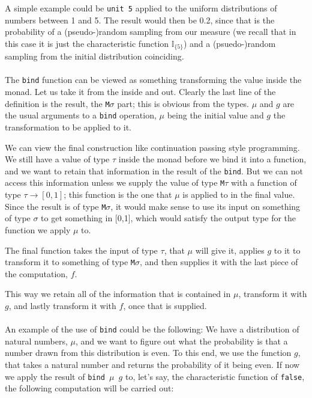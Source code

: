 \documentclass[11pt, leqno, titlepage]{article}
\theoremstyle{definition}
\begin{document}
A simple example could be \texttt{unit 5} applied to the uniform distributions of
numbers between 1 and 5. The result would then be 0.2, since that is the probability
of a (pseudo-)random sampling from our measure (we recall that in this case it is
just the characteristic function $\mathbb{I}_{\{5\}}$) and a (psuedo-)random sampling
from the initial distribution coinciding. 
\\ \\
The \texttt{bind} function can be viewed as something transforming the value inside
the monad. 
Let us take it from the inside and out. Clearly the last line of the definition is
the result, the \texttt{M}$\sigma$ part; this is obvious from the types. $\mu$ and
$g$ are the usual arguments to a \texttt{bind} operation, $\mu$ being the initial
value and $g$ the transformation to be applied to it.

We can view the final construction like continuation passing style programming. We
still have a value of type $\tau$ inside the monad before we bind it into a function,
and we want to retain that information in the result of the \texttt{bind}. But we can
not access this information unless we supply the value of type \texttt{M}$\tau$ with
a function of type $\tau \to [0,1]$; this function is the one that $\mu$ is applied
to in the final value. Since the result is of type \texttt{M}$\sigma$, it would make
sense to use its input on something of type $\sigma$ to get something in [0,1], which
would satisfy the output type for the function we apply $\mu$ to.

The final function takes the input of type $\tau$, that $\mu$ will give it,
applies $g$ to it to transform it to something of type \texttt{M}$\sigma$, and then
supplies it with the last piece of the computation, $f$.

This way we retain all of the information that is contained in $\mu$, transform it
with $g$, and lastly transform it with $f$, once that is supplied.\\
\\
An example of the use of \texttt{bind} could be the following: We have a distribution
of natural numbers, $\mu$, and we want to figure out what the probability is that a
number drawn from this distribution is even. To this end, we use the function $g$,
that takes a natural number and returns the probability of it being even. If now we
apply the result of \texttt{bind $\mu$ $g$} to, let's say, the characteristic
function of \texttt{false}, the following computation will be carried out:
\end{document}
